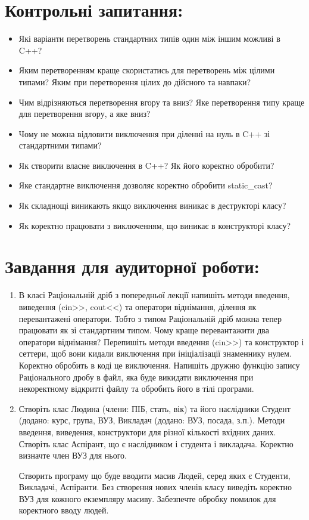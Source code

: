 \documentclass[a5paper,titlepage,openany,twoside,draft]{book_unv}%
\begin{document}
\section{Контрольні запитання:}
\begin{itemize}
\item
  Які варіанти перетворень стандартних типів один між іншим можливі в
  C++?
\item
  Яким перетворенням краще скористатись для перетворень між цілими
  типами? Яким при перетворення цілих до дійсного та навпаки?
\item
  Чим відрізняються перетворення вгору та вниз? Яке перетворення типу
  краще для перетворення вгору, а яке вниз?
\item
  Чому не можна відловити виключення при діленні на нуль в C++ зі
  стандартними типами?
\item
  Як створити власне виключення в C++? Як його коректно обробити?
\item
  Яке стандартне виключення дозволяє коректно обробити static\_cast?
\item
  Як складнощі виникають якщо виключення виникає в деструкторі класу?
\item
  Як коректно працювати з виключенням, що виникає в конструкторі класу?
\end{itemize}

\section{Завдання для аудиторної роботи:}

\begin{enumerate}
\def\labelenumi{\arabic{enumi})}

\item
  В класі Раціональній дріб з попередньої лекції напишіть методи
  введення, виведення (cin\textgreater{}\textgreater{},
  cout\textless{}\textless{}) та оператори віднімання, ділення як
  перевантажені оператори. Тобто з типом Раціональній дріб можна тепер
  працювати як зі стандартним типом. Чому краще перевантажити два
  оператори віднімання? Перепишіть методи введення
  (cin\textgreater{}\textgreater{}) та конструктор і сеттери, щоб вони
  кидали виключення при ініціалізації знаменнику нулем. Коректно
  обробить в коді це виключення. Напишіть дружню функцію запису
  Раціонального дробу в файл, яка буде викидати виключення при
  некоректному відкритті файлу та обробить його в тілі програми.

\item
  Створіть клас Людина (члени: ПІБ, стать, вік) та його наслідники
  Студент (додано: курс, група, ВУЗ, Викладач (додано: ВУЗ, посада,
  з.п.). Методи введення, виведення, конструктори для різної кількості
  вхідних даних. Створіть клас Аспірант, що є наслідником і студента і викладача.
 Коректно визначте член ВУЗ для нього. 

 Створить програму що буде вводити масив Людей, серед яких є Студенти,
Викладачі, Аспіранти. Без створення нових членів класу виведіть коректно
ВУЗ для кожного екземпляру масиву. Забезпечте обробку помилок для коректного вводу людей.
\end{enumerate}
\end{document}
